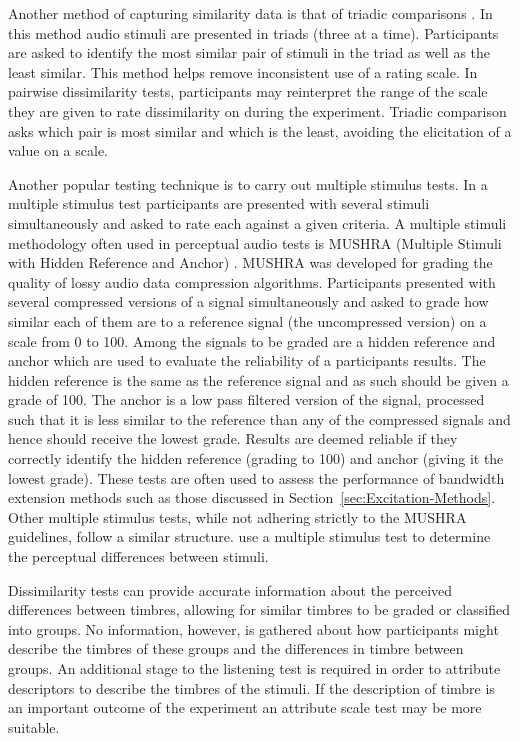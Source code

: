 			Another method of capturing similarity data is that of triadic comparisons
			\citep{wickelmaier2007deriving}. In this method audio stimuli are presented in triads (three at a
			time). Participants are asked to identify the most similar pair of stimuli in the triad as well as
			the least similar. This method helps remove inconsistent use of a rating scale. In pairwise
			dissimilarity tests, participants may reinterpret the range of the scale they are given to rate
			dissimilarity on during the experiment. Triadic comparison asks which pair is most similar and
			which is the least, avoiding the elicitation of a value on a scale.

			Another popular testing technique is to carry out multiple stimulus tests. In a multiple stimulus
			test participants are presented with several stimuli simultaneously and asked to rate each against
			a given criteria. A multiple stimuli methodology often used in perceptual audio tests is MUSHRA
			(Multiple Stimuli with Hidden Reference and Anchor) \citep{mushra2014}. MUSHRA was developed for
			grading the quality of lossy audio data compression algorithms. Participants presented with several
			compressed versions of a signal simultaneously and asked to grade how similar each of them are to a
			reference signal (the uncompressed version) on a scale from 0 to 100. Among the signals to be
			graded are a hidden reference and anchor which are used to evaluate the reliability of a
			participants results. The hidden reference is the same as the reference signal and as such should
			be given a grade of 100. The anchor is a low pass filtered version of the signal, processed such
			that it is less similar to the reference than any of the compressed signals and hence should
			receive the lowest grade. Results are deemed reliable if they correctly identify the hidden
			reference (grading to 100) and anchor (giving it the lowest grade). These tests are often used to
			assess the performance of bandwidth extension methods such as those discussed in
			Section~\ref{sec:Excitation-Methods}. Other multiple stimulus tests, while not adhering strictly to
			the MUSHRA guidelines, follow a similar structure.  \citet{arthi2015influence} use a multiple
			stimulus test to determine the perceptual differences between stimuli. 
			
			Dissimilarity tests can provide accurate information about the perceived differences between
			timbres, allowing for similar timbres to be graded or classified into groups. No information,
			however, is gathered about how participants might describe the timbres of these groups and
			the differences in timbre between groups. An additional stage to the listening test is required in
			order to attribute descriptors to describe the timbres of the stimuli. If the description of timbre
			is an important outcome of the experiment an attribute scale test may be more suitable.
			
